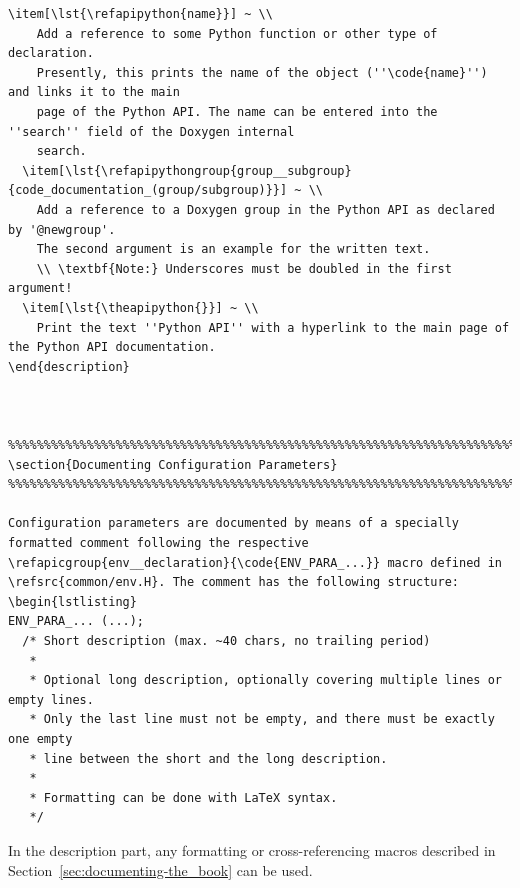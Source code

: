 \documentclass[12pt,english,parskip=half,headheight=19pt]{scrreprt}
\renewenvironment{description}[1][8ex]
  {\list{}{\labelwidth=5ex \leftmargin=#1 \let\makelabel\descriptionlabel}}
  {\endlist}
\newcommand{\lst}[1]{\colorbox{lstbackground}{\footnotesize\code{#1}}}
\newcommand{\refdoc}[2]{\href{#1}{#2}}              %
\newcommand{\refsrc}[1]{\href{#1}{\texttt{#1}}}     %
\newcommand{\refapipython}[1]{\href{home2l-api_python/index.html}{\mbox{\texttt{#1}}}}  %
\newcommand{\refapicgroup}[2]{\href{home2l-api_c/group__#1.html}{#2}}
\newcommand{\refapipythongroup}[2]{\href{home2l-api_python/group__#1.html}{#2}}
\newcommand{\theapipython}{\refdoc{home2l-api_python/index.html}{Python API}}
\begin{document}
\begin{description}
{\begin{lstlisting}[language=<language>]
  \item[\lst{\refapipython{name}}] ~ \\
    Add a reference to some Python function or other type of declaration.
    Presently, this prints the name of the object (''\code{name}'') and links it to the main
    page of the Python API. The name can be entered into the ''search'' field of the Doxygen internal
    search.
  \item[\lst{\refapipythongroup{group__subgroup}{code_documentation_(group/subgroup)}}] ~ \\
    Add a reference to a Doxygen group in the Python API as declared by '@newgroup'.
    The second argument is an example for the written text.
    \\ \textbf{Note:} Underscores must be doubled in the first argument!
  \item[\lst{\theapipython{}}] ~ \\
    Print the text ''Python API'' with a hyperlink to the main page of the Python API documentation.
\end{description}



%%%%%%%%%%%%%%%%%%%%%%%%%%%%%%%%%%%%%%%%%%%%%%%%%%%%%%%%%%%%%%%%%%%%%%%%%%
\section{Documenting Configuration Parameters}
%%%%%%%%%%%%%%%%%%%%%%%%%%%%%%%%%%%%%%%%%%%%%%%%%%%%%%%%%%%%%%%%%%%%%%%%%%

Configuration parameters are documented by means of a specially formatted comment following the respective
\refapicgroup{env__declaration}{\code{ENV_PARA_...}} macro defined in \refsrc{common/env.H}. The comment has the following structure:
\begin{lstlisting}
ENV_PARA_... (...);
  /* Short description (max. ~40 chars, no trailing period)
   *
   * Optional long description, optionally covering multiple lines or empty lines.
   * Only the last line must not be empty, and there must be exactly one empty
   * line between the short and the long description.
   *
   * Formatting can be done with LaTeX syntax.
   */
\end{lstlisting}

In the description part, any formatting or cross-referencing macros described in Section~\ref{sec:documenting-the_book}
can be used.



}
\end{description}
\end{document}
